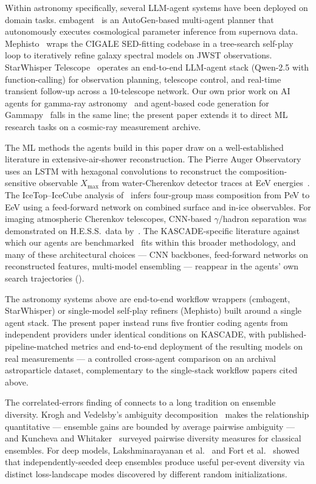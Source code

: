 \documentclass[universe,article,submit,pdftex,oneauthor]{Definitions/mdpi}
\begin{document}
Within astronomy specifically, several LLM-agent systems have been deployed on domain tasks. cmbagent~\cite{cmbagent} is an AutoGen-based multi-agent planner that autonomously executes cosmological parameter inference from supernova data. Mephisto~\cite{mephisto} wraps the CIGALE SED-fitting codebase in a tree-search self-play loop to iteratively refine galaxy spectral models on JWST observations. StarWhisper Telescope~\cite{starwhisper} operates an end-to-end LLM-agent stack (Qwen-2.5 with function-calling) for observation planning, telescope control, and real-time transient follow-up across a 10-telescope network. Our own prior work on AI agents for gamma-ray astronomy~\cite{kostunin_agents2025} and agent-based code generation for Gammapy~\cite{gammapy_agents} falls in the same line; the present paper extends it to direct ML research tasks on a cosmic-ray measurement archive.

The ML methods the agents build in this paper draw on a well-established literature in extensive-air-shower reconstruction. The Pierre Auger Observatory uses an LSTM with hexagonal convolutions to reconstruct the composition-sensitive observable $X_\mathrm{max}$ from water-Cherenkov detector traces at EeV energies~\cite{auger_dl_xmax}. The IceTop--IceCube analysis of~\cite{icetop_composition} infers four-group mass composition from PeV to EeV using a feed-forward network on combined surface and in-ice observables. For imaging atmospheric Cherenkov telescopes, CNN-based $\gamma$/hadron separation was demonstrated on H.E.S.S.\ data by~\cite{hess_cnn_sep}. The KASCADE-specific literature against which our agents are benchmarked~\cite{kascade_icrc,kascade_jinst,kascade_jcap} fits within this broader methodology, and many of these architectural choices --- CNN backbones, feed-forward networks on reconstructed features, multi-model ensembling --- reappear in the agents' own search trajectories ().

The astronomy systems above are end-to-end workflow wrappers (cmbagent, StarWhisper) or single-model self-play refiners (Mephisto) built around a single agent stack. The present paper instead runs five frontier coding agents from independent providers under identical conditions on KASCADE, with published-pipeline-matched metrics and end-to-end deployment of the resulting models on real measurements --- a controlled cross-agent comparison on an archival astroparticle dataset, complementary to the single-stack workflow papers cited above.

The correlated-errors finding of  connects to a long tradition on ensemble diversity. Krogh and Vedelsby's ambiguity decomposition~\cite{krogh_ambiguity} makes the relationship quantitative --- ensemble gains are bounded by average pairwise ambiguity --- and Kuncheva and Whitaker~\cite{kuncheva_diversity} surveyed pairwise diversity measures for classical ensembles. For deep models, Lakshminarayanan et al.~\cite{deep_ensembles} and Fort et al.~\cite{fort_loss_landscape} showed that independently-seeded deep ensembles produce useful per-event diversity via distinct loss-landscape modes discovered by different random initializations.
\end{document}
